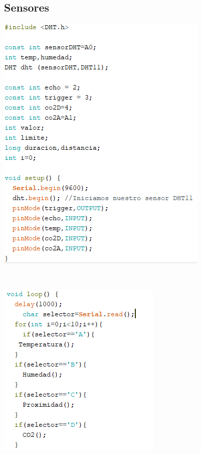 \documentclass[letterpaper, 10 pt, conference]{ieeeconf}
\begin{document}
\subsection{Sensores}
\begin{center}
\includegraphics[scale=0.8]{Documento/Figuras/12.PNG}
\begin{scriptsize}
\\ 
\end{scriptsize}
\end{center}
\begin{center}
\includegraphics[scale=0.8]{Documento/Figuras/13.PNG}
\begin{scriptsize}
\\ 
\end{scriptsize}
\end{center}
\end{document}
